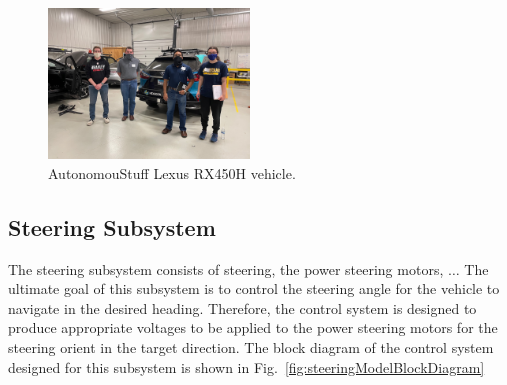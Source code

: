 \documentclass[journal,twoside,web]{ieeecolor}
\begin{document}
% 
\begin{figure}[htbp]
	\centering
	\includegraphics[height=4cm]{figs/img/picturesVisitToAStuff/visitors1-20211007}
	\caption{AutonomouStuff Lexus RX450H vehicle.}
	\label{fig:lexusvehicle}
\end{figure}

\subsection{Steering Subsystem}
\label{sec:steeringSubsystem}

The steering subsystem consists of steering, the power steering motors, $\ldots$ The ultimate goal of this subsystem is to control the steering angle for the vehicle to navigate in the desired heading. Therefore, the control system is designed to produce appropriate voltages to be applied to the power steering motors for the steering orient in the target direction. The block diagram of the control system designed for this subsystem is shown in Fig.~\ref{fig:steeringModelBlockDiagram}
\end{document}
